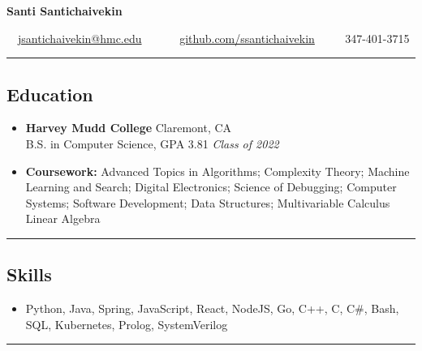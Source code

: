 \documentclass[10pt,letterpaper]{article}
\begin{document}
\fontsize{9.0}{11.0}\selectfont

\begin{center}
{\Large \textbf{Santi Santichaivekin}}

\ \ \href{mailto:jsantichaivekin@hmc.edu}{jsantichaivekin@hmc.edu}\ \ 
\ \ \textbullet
\ \ \href{https://github.com/ssantichaivekin}{github.com/ssantichaivekin}
\ \ \textbullet
\ \ 347-401-3715

\end{center}

\vspace{-0.25em}
\hrule
\vspace{-0.55em}
\subsection*{Education}
  \begin{itemize}
    \parskip=-0.25em
    \item[]
    \textbf{Harvey Mudd College} \hfill
      Claremont, CA\\
    {B.S. in Computer Science, GPA 3.81
    \hfill \emph{Class of 2022}}\\
    \item[]
    \vspace{-1.3em}
    \textbf{Coursework:}
  Advanced Topics in Algorithms; 
  Complexity Theory;
  Machine Learning and Search; 
  Digital Electronics; 
  Science of Debugging;
  Computer Systems;
  Software Development;
  Data Structures;
  Multivariable Calculus
  Linear Algebra
  \end{itemize}

\vspace{-0.25em}
\hrule
\vspace{-0.55em}
\subsection*{Skills}
\begin{itemize}
\parskip=-0.25em
\item[]
  Python,
  Java, Spring,
  JavaScript, React, NodeJS,
  Go,
  C++,
  C,
  C\#,
  Bash,
  SQL,
  Kubernetes,
  Prolog,
  SystemVerilog
    
\end{itemize}

\vspace{-0.25em}
\hrule
\vspace{-0.55em}
\end{document}

